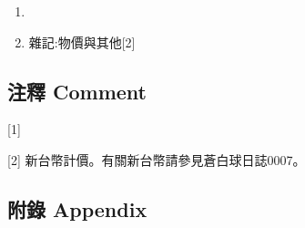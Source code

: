 \documentclass[a5paper, 12pt
]{book}
\begin{document}
\begin{enumerate}
\def\labelenumi{\arabic{enumi}.}
\item
\item
  雜記:物價與其他{[}2{]}
\end{enumerate}

\hypertarget{ux6ce8ux91cb-comment-56}{%
\subsection{注釋 Comment}\label{ux6ce8ux91cb-comment-56}}

{[}1{]}

{[}2{]} 新台幣計價。有關新台幣請參見蒼白球日誌0007。

\hypertarget{ux9644ux9304-appendix-55}{%
\subsection{附錄 Appendix}\label{ux9644ux9304-appendix-55}}
\end{document}
